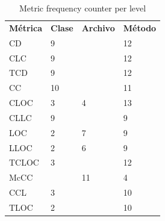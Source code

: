 \begin{table}[H]
\caption{\label{table:metricsCountPerLevel} Metric frequency counter per level}

\begin{center}
\begin{tabular}{llll}
\multicolumn{1}{c}{\textbf{Métrica}} & \multicolumn{1}{c}{\textbf{Clase}} & \multicolumn{1}{c}{\textbf{Archivo}} & \multicolumn{1}{c}{\textbf{Método}} \\
CD                                  & 9                                  &                                   & 12                                  \\
CLC                                 & 9                                  &                                   & 12                                  \\
TCD                                 & 9                                  &                                   & 12                                  \\
CC                                  & 10                                 &                                   & 11                                  \\
CLOC                                & 3                                  & 4                                 & 13                                  \\
CLLC                                & 9                                  &                                   & 9                                   \\
LOC                                 & 2                                  & 7                                 & 9                                   \\
LLOC                                & 2                                  & 6                                 & 9                                   \\
TCLOC                               & 3                                  &                                   & 12                                  \\
McCC                                &                                    & 11                                & 4                                   \\
CCL                                 & 3                                  &                                   & 10                                  \\
TLOC                                & 2                                  &                                   & 10                                  \\

\end{tabular}
\end{center}
\end{table}
